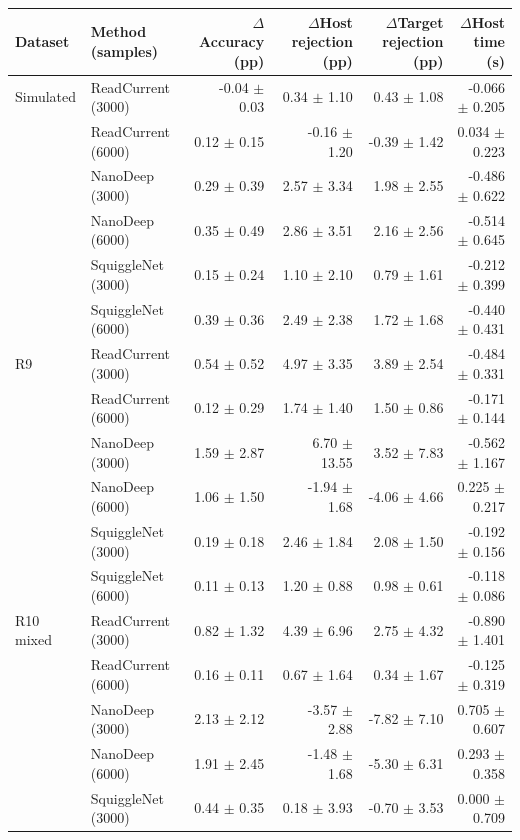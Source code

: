 \begin{tabular}{@{}llrrrr@{}}\toprule
Dataset & Method (samples) & $\Delta$Accuracy (pp) & $\Delta$Host rejection (pp) & $\Delta$Target rejection (pp) & $\Delta$Host time (s)\\\midrule
Simulated & ReadCurrent (3000) & -0.04 $\pm$ 0.03 & 0.34 $\pm$ 1.10 & 0.43 $\pm$ 1.08 & -0.066 $\pm$ 0.205\\
 & ReadCurrent (6000) & 0.12 $\pm$ 0.15 & -0.16 $\pm$ 1.20 & -0.39 $\pm$ 1.42 & 0.034 $\pm$ 0.223\\
 & NanoDeep (3000) & 0.29 $\pm$ 0.39 & 2.57 $\pm$ 3.34 & 1.98 $\pm$ 2.55 & -0.486 $\pm$ 0.622\\
 & NanoDeep (6000) & 0.35 $\pm$ 0.49 & 2.86 $\pm$ 3.51 & 2.16 $\pm$ 2.56 & -0.514 $\pm$ 0.645\\
 & SquiggleNet (3000) & 0.15 $\pm$ 0.24 & 1.10 $\pm$ 2.10 & 0.79 $\pm$ 1.61 & -0.212 $\pm$ 0.399\\
 & SquiggleNet (6000) & 0.39 $\pm$ 0.36 & 2.49 $\pm$ 2.38 & 1.72 $\pm$ 1.68 & -0.440 $\pm$ 0.431\\
\addlinespace
R9 & ReadCurrent (3000) & 0.54 $\pm$ 0.52 & 4.97 $\pm$ 3.35 & 3.89 $\pm$ 2.54 & -0.484 $\pm$ 0.331\\
 & ReadCurrent (6000) & 0.12 $\pm$ 0.29 & 1.74 $\pm$ 1.40 & 1.50 $\pm$ 0.86 & -0.171 $\pm$ 0.144\\
 & NanoDeep (3000) & 1.59 $\pm$ 2.87 & 6.70 $\pm$ 13.55 & 3.52 $\pm$ 7.83 & -0.562 $\pm$ 1.167\\
 & NanoDeep (6000) & 1.06 $\pm$ 1.50 & -1.94 $\pm$ 1.68 & -4.06 $\pm$ 4.66 & 0.225 $\pm$ 0.217\\
 & SquiggleNet (3000) & 0.19 $\pm$ 0.18 & 2.46 $\pm$ 1.84 & 2.08 $\pm$ 1.50 & -0.192 $\pm$ 0.156\\
 & SquiggleNet (6000) & 0.11 $\pm$ 0.13 & 1.20 $\pm$ 0.88 & 0.98 $\pm$ 0.61 & -0.118 $\pm$ 0.086\\
\addlinespace
R10 mixed & ReadCurrent (3000) & 0.82 $\pm$ 1.32 & 4.39 $\pm$ 6.96 & 2.75 $\pm$ 4.32 & -0.890 $\pm$ 1.401\\
 & ReadCurrent (6000) & 0.16 $\pm$ 0.11 & 0.67 $\pm$ 1.64 & 0.34 $\pm$ 1.67 & -0.125 $\pm$ 0.319\\
 & NanoDeep (3000) & 2.13 $\pm$ 2.12 & -3.57 $\pm$ 2.88 & -7.82 $\pm$ 7.10 & 0.705 $\pm$ 0.607\\
 & NanoDeep (6000) & 1.91 $\pm$ 2.45 & -1.48 $\pm$ 1.68 & -5.30 $\pm$ 6.31 & 0.293 $\pm$ 0.358\\
 & SquiggleNet (3000) & 0.44 $\pm$ 0.35 & 0.18 $\pm$ 3.93 & -0.70 $\pm$ 3.53 & 0.000 $\pm$ 0.709\\

\end{tabular}
